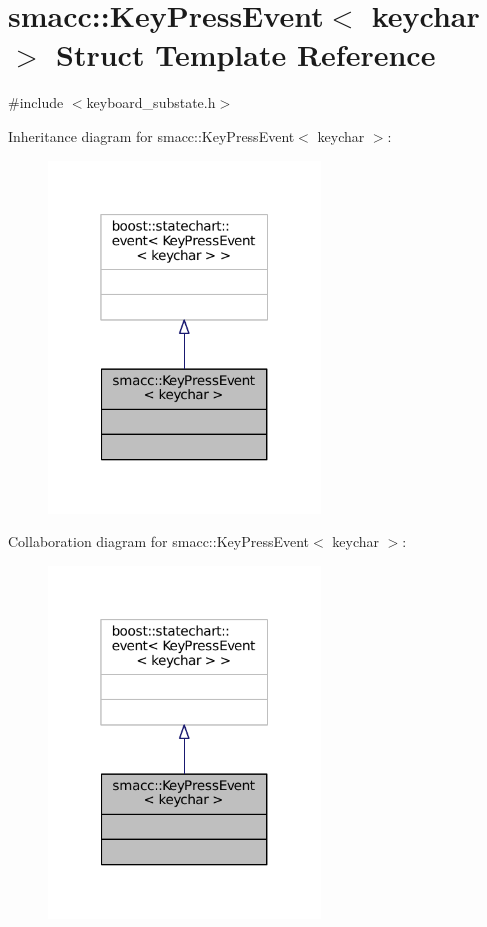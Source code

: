 \hypertarget{structsmacc_1_1KeyPressEvent}{}\section{smacc\+:\+:Key\+Press\+Event$<$ keychar $>$ Struct Template Reference}
\label{structsmacc_1_1KeyPressEvent}


{\ttfamily \#include $<$keyboard\+\_\+substate.\+h$>$}



Inheritance diagram for smacc\+:\+:Key\+Press\+Event$<$ keychar $>$\+:
\nopagebreak
\begin{figure}[H]
\begin{center}
\leavevmode
\includegraphics[width=205pt]{structsmacc_1_1KeyPressEvent__inherit__graph}
\end{center}
\end{figure}


Collaboration diagram for smacc\+:\+:Key\+Press\+Event$<$ keychar $>$\+:
\nopagebreak
\begin{figure}[H]
\begin{center}
\leavevmode
\includegraphics[width=205pt]{structsmacc_1_1KeyPressEvent__coll__graph}
\end{center}
\end{figure}


